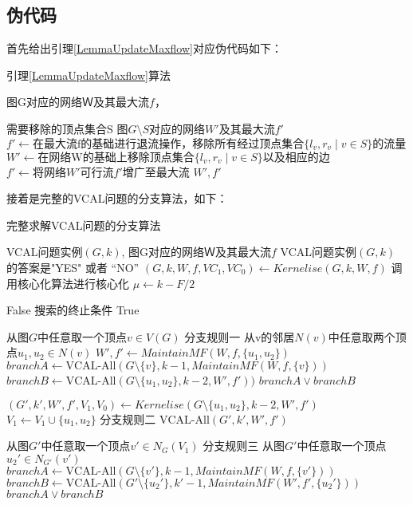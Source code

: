 \newpage
\subsection{伪代码}
首先给出引理\ref{LemmaUpdateMaxflow}对应伪代码如下：
\begin{algorithm}
\caption{引理\ref{LemmaUpdateMaxflow}算法}
\begin{algorithmic}[1]
\Require 图G对应的网络Ｗ及其最大流$f$，

需要移除的顶点集合S
\Ensure  图$G\setminus S$对应的网络$W'$及其最大流$f'$
    \State $f' \gets \text{在最大流f的基础进行退流操作，移除所有经过顶点集合$\{l_v, r_v\;|\;v \in S\}$的流量}$
    \State $W' \gets \text{在网络W的基础上移除顶点集合$\{l_v, r_v\;|\;v \in S\}$以及相应的边}$
    \State $f' \gets \text{将网络$W'$可行流$f'$增广至最大流}$
    \State \Return $W', f'$
\EndFunction
\end{algorithmic}
\end{algorithm}

接着是完整的VCAL问题的分支算法，如下：
\begin{algorithm}
\caption{完整求解VCAL问题的分支算法}
\begin{algorithmic}[1]
\Require VCAL问题实例$(G,k)$, 图G对应的网络Ｗ及其最大流$f$
\Ensure  VCAL问题实例$(G,k)$ 的答案是"YES" 或者 “NO”
    \State $(G, k, W, f, VC_1, VC_0) \gets Kernelise(G, k, W, f)$
    \Comment 调用核心化算法进行核心化
    \State $\mu \gets k - F / 2$

     \Return False \Comment 搜索的终止条件
     \Return True
    \EndIf

    \State 从图$G$中任意取一个顶点$v \in V(G)$ \Comment 分支规则一
    \State 从v的邻居$N(v)$中任意取两个顶点$u_1, u_2 \in N(v)$
    \State $W', f' \gets MaintainMF(W, f, \{u_1, u_2\})$
        \State $branchA \gets \text{VCAL-All}(G\setminus\{v\}, k - 1, MaintainMF(W, f, \{v\}))$
        \State $branchB \gets \text{VCAL-All}(G\setminus\{u_1, u_2\}, k - 2, W', f'))$
        \State \Return $branchA \vee branchB$
    \EndIf

    \State $(G', k', W', f', V_1, V_0) \gets Kernelise(G\setminus\{u_1, u_2\}, k - 2, W', f')$
    \State $V_1 \gets V_1 \cup \{u_1, u_2\}$
     \Comment 分支规则二
        \State \Return $\text{VCAL-All}(G', k', W', f')$
    \EndIf

    \State 从图$G'$中任意取一个顶点$v' \in N_G(V_1)$ \Comment 分支规则三
    \State 从图$G'$中任意取一个顶点$u_2' \in N_{G'}(v')$
    \State $branchA \gets \text{VCAL-All}(G\setminus\{v'\}, k - 1, MaintainMF(W, f, \{v'\}))$
    \State $branchB \gets \text{VCAL-All}(G'\setminus\{u_2'\}, k' - 1, MaintainMF(W', f', \{u_2'\}))$
    \State \Return $branchA \vee branchB$

\EndFunction
\end{algorithmic}
\end{algorithm} 